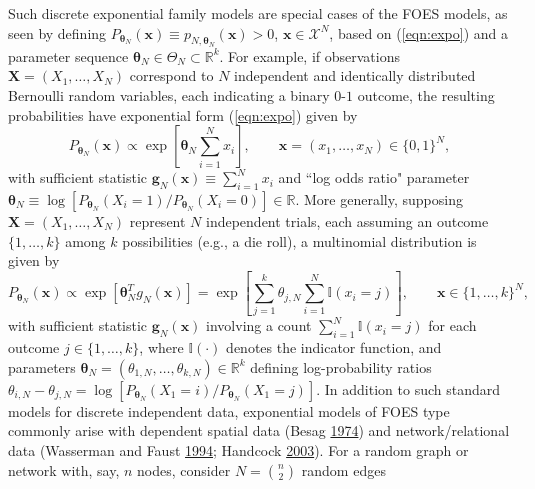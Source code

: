 \documentclass[12pt]{article}
\theoremstyle{definition}
\begin{document}
Such discrete exponential family models are special cases of the FOES models, as seen by  defining $P_{\boldsymbol \theta_N}(\boldsymbol x)\equiv p_{N,\boldsymbol \theta_N}(\boldsymbol x)> 0$,  $\boldsymbol x \in \mathcal{X}^N$, based on (\ref{eqn:expo}) and a parameter sequence $\boldsymbol \theta_N \in \Theta_N \subset \mathbb{R}^k$.  For example, if observations $\boldsymbol X=(X_1,\ldots,X_N)$ correspond to $N$ independent and identically distributed Bernoulli random variables, each indicating a binary $0$-$1$ outcome,  the resulting probabilities have exponential form (\ref{eqn:expo})  given by
\begin{equation}
\label{eqn:mod1} P_{\boldsymbol \theta_N}(\boldsymbol x) \propto
 \exp\left[\boldsymbol \theta_N \sum_{i=1}^N x_i\right], \qquad \boldsymbol x=(x_1,\ldots,x_N) \in\{0,1\}^N, \end{equation} with sufficient statistic $\boldsymbol g_N(\boldsymbol x)\equiv \sum_{i=1}^N  x_i$ and ``log odds ratio" parameter $\boldsymbol \theta_N \equiv  \log[ P_{\boldsymbol \theta_N}(X_i=1)/P_{\boldsymbol \theta_N}(X_i=0) ] \in \mathbb{R}$.  More generally,
 supposing $\boldsymbol X =(X_1,\ldots,X_N)$ represent  $N$
independent trials, each assuming an outcome $\{1,\ldots,k\}$ among $k$ possibilities (e.g., a die roll), a multinomial distribution is given by
   \begin{equation}
   \label{eqn:mod11} P_{\boldsymbol \theta_N}(\boldsymbol x) \propto  \exp\left[  \boldsymbol \theta_{N}^T g_N(\boldsymbol x)   \right]=
  \exp\left[ \sum_{j=1}^k {\theta_{j,N}} \sum_{i=1}^N \mathbb{I}(x_i=j) \right], \qquad \boldsymbol x  \in\{1,\ldots,k\}^N, \end{equation}
with sufficient statistic $\boldsymbol g_N(\boldsymbol x)$ involving a count $\sum_{i=1}^N \mathbb{I}(x_i=j)$  for each outcome $j\in\{1,\ldots,k\}$, where $\mathbb{I}(\cdot)$ denotes the indicator function,   and parameters $\boldsymbol \theta_N=(\theta_{1,N},\ldots,\theta_{k,N})\in\mathbb{R}^k$ defining log-probability ratios
$\theta_{i,N}-\theta_{j,N} =\log [P_{\boldsymbol \theta_N}(X_1=i)/P_{\boldsymbol \theta_N}(X_1=j)]$.  In addition to such standard models for discrete independent data,
exponential models of FOES type commonly arise with
 dependent spatial data   (Besag
\protect\hyperlink{ref-besag1974spatial}{1974}) and network/relational data (Wasserman
and Faust \protect\hyperlink{ref-wasserman1994social}{1994}; Handcock
\protect\hyperlink{ref-handcock2003assessing}{2003}). For a random graph  or network  with, say, $n$ nodes,  consider $N={n \choose 2}$ random edges
\end{document}
